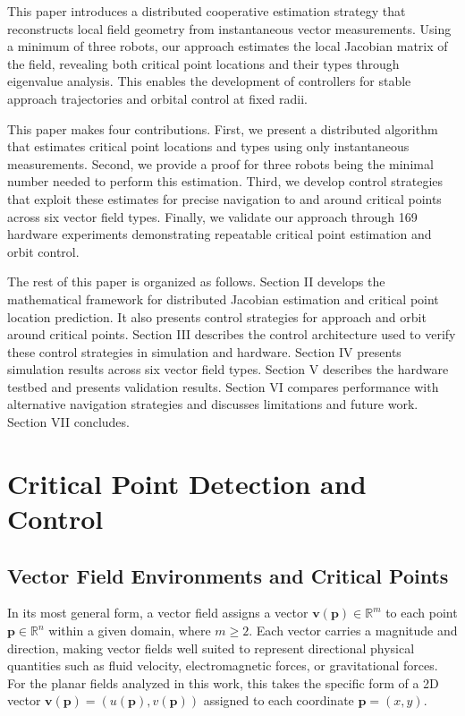 \documentclass[lettersize,journal]{IEEEtran}
\begin{document}
This paper introduces a distributed cooperative estimation strategy that reconstructs local field geometry from instantaneous vector measurements. Using a minimum of three robots, our approach estimates the local Jacobian matrix of the field, revealing both critical point locations and their types through eigenvalue analysis. This enables the development of controllers for stable approach trajectories and orbital control at fixed radii.

This paper makes four contributions. First, we present a distributed algorithm that estimates critical point locations and types using only instantaneous measurements. Second, we provide a proof for three robots being the minimal number needed to perform this estimation. Third, we develop control strategies that exploit these estimates for precise navigation to and around critical points across six vector field types. Finally, we validate our approach through 169 hardware experiments demonstrating repeatable critical point estimation and orbit control.

The rest of this paper is organized as follows. Section II develops the mathematical framework for distributed Jacobian estimation and critical point location prediction. It also presents control strategies for approach and orbit around critical points. Section III describes the control architecture used to verify these control strategies in simulation and hardware. Section IV presents simulation results across six vector field types. Section V describes the hardware testbed and presents validation results. Section VI compares performance with alternative navigation strategies and discusses limitations and future work. Section VII concludes.



\section{Critical Point Detection and Control}

\subsection{Vector Field Environments and Critical Points}

In its most general form, a vector field assigns a vector $\mathbf{v}(\mathbf{p}) \in \mathbb{R}^m$ to each point $\mathbf{p} \in \mathbb{R}^n$ within a given domain, where $m \geq 2$. Each vector carries a magnitude and direction, making vector fields well suited to represent directional physical quantities such as fluid velocity, electromagnetic forces, or gravitational forces. For the planar fields analyzed in this work, this takes the specific form of a 2D vector $\mathbf{v}(\mathbf{p}) = (u(\mathbf{p}), v(\mathbf{p}))$ assigned to each coordinate $\mathbf{p} = (x, y)$.
\end{document}
